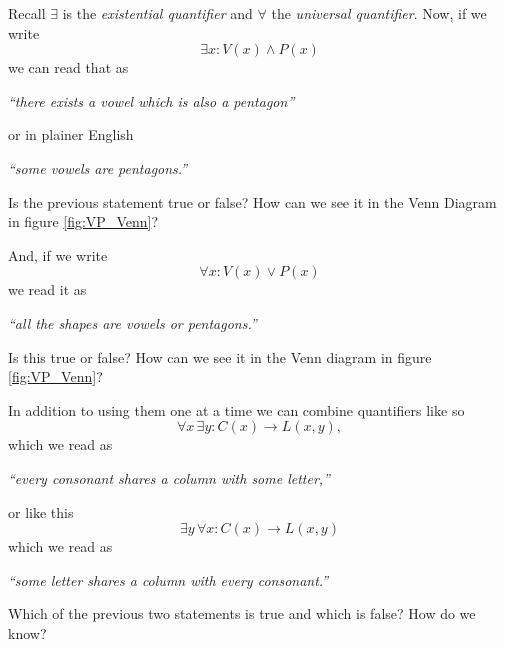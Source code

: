 \clearpage

\begin{exposition}
Recall \(\exists\) is the \emph{existential quantifier} and \(\forall\) the \emph{universal quantifier}.  Now, if we write 
    \[\exists x: V(x)\wedge P(x)\]
we can read that as 
\begin{center}
    \textit{``there exists a vowel which is also a pentagon''}
\end{center} 
or in plainer English 
\begin{center}
    \textit{``some vowels are pentagons.''}
\end{center} 
Is the previous statement true or false? How can we see it in the Venn Diagram in figure \ref{fig:VP_Venn}?\vspace{3\baselineskip}

\noindent
And, if we write 
    \[\forall x: V(x)\vee P(x)\]
we read it as 
\begin{center}
    \textit{``all the shapes are vowels or pentagons.''}
\end{center} Is this true or false? How can we see it in the Venn diagram in figure \ref{fig:VP_Venn}?\vspace{3\baselineskip}

\noindent
In addition to using them one at a time we can combine quantifiers like so 
    \[\forall x\,  \exists y: C(x)\rightarrow L(x,y),\] 
which we read as 
\begin{center}
    \textit{``every consonant shares a column with some letter,''}
\end{center} or like this \[\exists y\, \forall x: C(x)\rightarrow L(x,y)\] which we read as 
\begin{center}
    \textit{``some letter shares a column with every consonant.''}
\end{center} Which of the previous two statements is true and which is false?  How do we know?\vspace{3\baselineskip}
\end{exposition}

\clearpage

